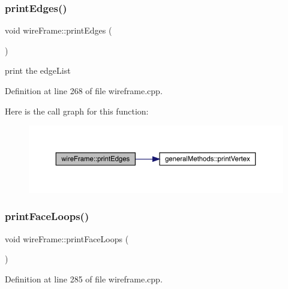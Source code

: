 \mbox{\label{classwire_frame_a0d08d6195d840341525651ec6d598408}} 
\subsubsection{\texorpdfstring{print\+Edges()}{printEdges()}}
{\footnotesize\ttfamily void wire\+Frame\+::print\+Edges (\begin{DoxyParamCaption}{ }\end{DoxyParamCaption})}

print the edge\+List

Definition at line 268 of file wireframe.\+cpp.

Here is the call graph for this function\+:
\nopagebreak
\begin{figure}[H]
\begin{center}
\leavevmode
\includegraphics[width=350pt]{classwire_frame_a0d08d6195d840341525651ec6d598408_cgraph}
\end{center}
\end{figure}
\mbox{\label{classwire_frame_a7c89bdfbf8e94eb33f90d6057f785cd9}} 
\subsubsection{\texorpdfstring{print\+Face\+Loops()}{printFaceLoops()}}
{\footnotesize\ttfamily void wire\+Frame\+::print\+Face\+Loops (\begin{DoxyParamCaption}{ }\end{DoxyParamCaption})}



Definition at line 285 of file wireframe.\+cpp.

